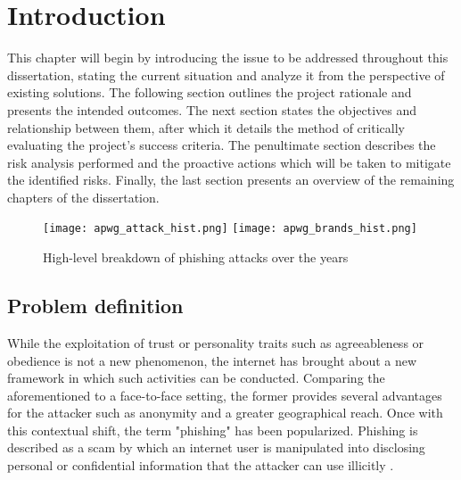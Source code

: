 
\chapter{Introduction}
\label{chap:intro}
This chapter will begin by introducing the issue to be addressed throughout
this dissertation, stating the current situation and analyze it from the
perspective of existing solutions. The following section outlines the project
rationale and presents the intended outcomes. The next section states the
objectives and relationship between them, after which it details the method of
critically evaluating the project's success criteria. The penultimate section
describes the risk analysis performed and the proactive actions which will be
taken to mitigate the identified risks. Finally, the last section presents an
overview of the remaining chapters of the dissertation.

\begin{figure}[b]
	\centering
	\texttt{[image: apwg\_attack\_hist.png]}
	\texttt{[image: apwg\_brands\_hist.png]}
	\caption{High-level breakdown of phishing attacks over the years}
	\label{fig:PHISHING_HISTORY}
\end{figure}

\section{Problem definition}
While the exploitation of trust or personality traits such as agreeableness or
obedience is not a new phenomenon, the internet has brought about a new
framework in which such activities can be conducted. Comparing the
aforementioned to a face-to-face setting, the former provides several advantages
for the attacker such as anonymity and a greater geographical reach. Once with
this contextual shift, the term "phishing" has been popularized. Phishing is
described as a scam by which an internet user is manipulated into disclosing
personal or confidential information that the attacker can use illicitly
\citep{MERRIAM_WEBSTER}.

